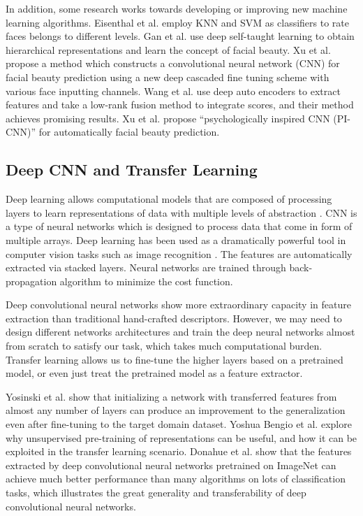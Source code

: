 \documentclass[a4paper,conference]{IEEEtran}
\begin{document}
    In addition, some research works towards developing or improving new machine
    learning algorithms.
    Eisenthal et al. \cite{eisenthal2006facial} employ KNN and SVM as classifiers
    to rate faces belongs to different levels.
    Gan et al. \cite{gan2014deep} use deep self-taught learning to obtain
    hierarchical representations and learn the concept of facial beauty.
    Xu et al. \cite{xu2015new} propose a method which constructs a convolutional
    neural network (CNN) for facial beauty prediction using
    a new deep cascaded fine tuning scheme with various face inputting channels.
    Wang et al. \cite{wang2014attractive} use deep auto encoders to extract
    features and take a low-rank fusion method to integrate scores, and their
    method achieves promising results.
    Xu et al. \cite{Xu2017Facial} propose  ``psychologically
    inspired CNN (PI-CNN)'' for automatically facial beauty prediction.


  \subsection{Deep CNN and Transfer Learning}
    Deep learning allows computational models that are composed of
    processing layers to learn representations of data with multiple levels of
    abstraction \cite{lecun2015deep}. CNN is a type of neural networks which is
    designed to process data that come in form of multiple arrays.
    Deep learning has been used as a dramatically powerful tool in computer
    vision tasks such as image recognition
    \cite{krizhevsky2012imagenet,simonyan2014very,szegedy2015going,he2016deep}.
    The features are automatically extracted via stacked layers.
    Neural networks are trained through
    back-propagation algorithm to minimize the cost function.

    Deep convolutional neural networks show more extraordinary capacity in
    feature extraction than traditional hand-crafted descriptors. However, we may
    need to design different networks architectures and train the deep neural
    networks almost from scratch to satisfy our task, which takes much
    computational burden.
    Transfer learning allows us to fine-tune the higher layers based on a
    pretrained model, or even just treat the pretrained model as a feature extractor.

    Yosinski et al. \cite{yosinski2014transferable} show that initializing
    a network with transferred features from almost any number of layers can
    produce an improvement to the generalization even after fine-tuning to
    the target domain dataset.
    Yoshua Bengio et al. \cite{bengio2012deep} explore why unsupervised
    pre-training of representations can be useful, and how it can be exploited
    in the transfer learning scenario.
    Donahue et al. \cite{donahue2014decaf} show that the features extracted by
    deep convolutional neural networks pretrained on ImageNet can achieve much
    better performance than many algorithms on lots of classification tasks,
    which illustrates the great generality and transferability of deep
    convolutional neural networks.
\end{document}
